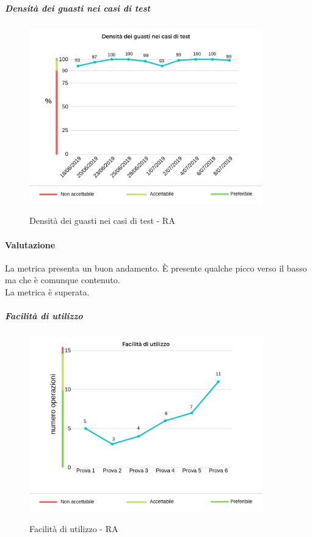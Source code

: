 	\subparagraph{Densità dei guasti nei casi di test}
	\begin{center}
		\begin{figure}[h] 
			\centering 
			\includegraphics[width=0.90\textwidth]{res/images/new/densitaGuasti.png}\\
			\caption{Densità dei guasti nei casi di test - RA}
		\end{figure}
	\end{center}
	\paragraph*{Valutazione} La metrica presenta  un buon andamento. È presente qualche picco verso il basso ma che è comunque contenuto. 
	\\
	La metrica è superata. 
	\pagebreak
	\subparagraph{Facilità di utilizzo}
	\begin{center}
		\begin{figure}[h] 
			\centering 
			\includegraphics[width=0.90\textwidth]{res/images/new/facilitaUtilizzo.png}\\
			\caption{Facilità di utilizzo - RA}
		\end{figure}
	\end{center}
